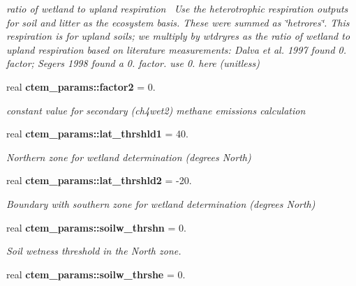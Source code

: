 \begin{DoxyCompactItemize}
\begin{DoxyCompactList}\small\item\em ratio of wetland to upland respiration~\newline
Use the heterotrophic respiration outputs for soil and litter as the ecosystem basis. These were summed as \char`\"{}hetrores\char`\"{}. This respiration is for upland soils; we multiply by wtdryres as the ratio of wetland to upland respiration based on literature measurements\+: Dalva et al. 1997 found 0. factor; Segers 1998 found a 0. factor. use 0. here (unitless) \end{DoxyCompactList}\item 
\hypertarget{namespacectem__params_aba1c91ff7281b9069ec03e8ecc581fef}{}real {\bfseries ctem\+\_\+params\+::factor2} = 0.\label{namespacectem__params_aba1c91ff7281b9069ec03e8ecc581fef}

\begin{DoxyCompactList}\small\item\em constant value for secondary (ch4wet2) methane emissions calculation \end{DoxyCompactList}\item 
\hypertarget{namespacectem__params_a3a63b83e7f97702b648861ae4a586b59}{}real {\bfseries ctem\+\_\+params\+::lat\+\_\+thrshld1} = 40.\label{namespacectem__params_a3a63b83e7f97702b648861ae4a586b59}

\begin{DoxyCompactList}\small\item\em Northern zone for wetland determination (degrees North) \end{DoxyCompactList}\item 
\hypertarget{namespacectem__params_ac0a149191207794d3a3867a93efc5757}{}real {\bfseries ctem\+\_\+params\+::lat\+\_\+thrshld2} = -\/20.\label{namespacectem__params_ac0a149191207794d3a3867a93efc5757}

\begin{DoxyCompactList}\small\item\em Boundary with southern zone for wetland determination (degrees North) \end{DoxyCompactList}\item 
\hypertarget{namespacectem__params_ab4795b61fccde1fc82638b5f8b9624aa}{}real {\bfseries ctem\+\_\+params\+::soilw\+\_\+thrshn} = 0.\label{namespacectem__params_ab4795b61fccde1fc82638b5f8b9624aa}

\begin{DoxyCompactList}\small\item\em Soil wetness threshold in the North zone. \end{DoxyCompactList}\item 
\hypertarget{namespacectem__params_adfd72c895e5b156dfa2bab6d694ab849}{}real {\bfseries ctem\+\_\+params\+::soilw\+\_\+thrshe} = 0.\label{namespacectem__params_adfd72c895e5b156dfa2bab6d694ab849}


\end{DoxyCompactItemize}
